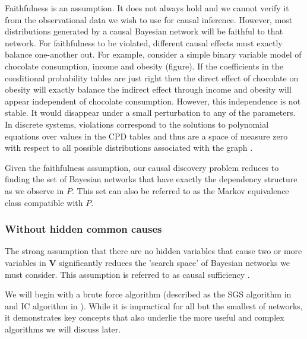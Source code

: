 \documentclass[11pt,a4paper,oneside]{book}
\theoremstyle{plain}
\theoremstyle{definition}
\begin{document}
Faithfulness is an assumption. It does not always hold and we cannot verify it from the observational data we wish to use for causal inference. However, most distributions generated by a causal Bayesian network will be faithful to that network. For faithfulness to be violated, different causal effects must exactly balance one-another out. For example, consider a simple binary variable model of chocolate consumption, income and obesity (figure). If the coefficients in the conditional probability tables are just right then the direct effect of chocolate on obesity will exactly balance the indirect effect through income and obesity will appear independent of chocolate consumption. However, this independence is not stable. It would disappear under a small perturbation to any of the parameters. In discrete systems, violations correspond to the solutions to polynomial equations over values in the CPD tables and thus are a space of measure zero with respect to all possible distributions associated with the graph \citep{Koller2009}. 

Given the faithfulness assumption, our causal discovery problem reduces to finding the set of Bayesian networks that have exactly the dependency structure as we observe in $P$. This set can also be referred to as the Markov equivalence class compatible with $P$.

\subsubsection{Without hidden common causes}
The strong assumption that there are no hidden variables that cause two or more variables in $\boldsymbol{V}$ significantly reduces the 'search space' of Bayesian networks we must consider. This assumption is referred to as causal sufficiency \citep{Sprites2000}.

We will begin with a brute force algorithm (described as the SGS algorithm in \citet{Sprites2000} and IC algorithm in \citet{Pearl2000}). While it is impractical for all but the smallest of networks, it demonstrates key concepts that also underlie the more useful and complex algorithms we will discuss later. 
\end{document}
